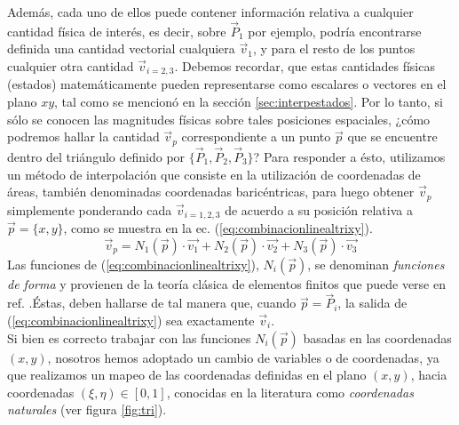 Además, cada uno de ellos puede contener información relativa a cualquier cantidad física de interés, es decir, sobre $ \vec{P}_{1} $ por ejemplo, podría encontrarse definida una cantidad vectorial cualquiera $ \vec{v}_{1}$, y para el resto de los puntos cualquier otra cantidad $ \vec{v}_{i=2,3} $. Debemos recordar, que estas cantidades físicas (estados) matemáticamente pueden representarse como escalares o vectores en el plano $xy$, tal como se mencionó en la sección \ref{sec:interpestados}. Por lo tanto, si sólo se conocen las magnitudes físicas sobre tales posiciones espaciales, ¿cómo podremos hallar la cantidad $ \vec{v}_{p} $ correspondiente a un punto $\vec{p}$ que se encuentre dentro del triángulo definido por $ \lbrace \vec{P}_{1}, \vec{P}_{2}, \vec{P}_{3}  \rbrace $? Para responder a ésto, utilizamos un método de interpolación que consiste en la utilización de coordenadas de áreas, también denominadas coordenadas baricéntricas, para luego obtener $ \vec{v}_{p} $ simplemente ponderando cada $ \vec{v}_{i=1,2,3} $ de acuerdo a su posición relativa a $ \vec{p} = \lbrace x,y \rbrace $, como se muestra en la ec. (\ref{eq:combinacionlinealtrixy}).
\begin{equation}
\label{eq:combinacionlinealtrixy}  
  \vec{v}_{p} = 
  N_{1}(\vec{p}) \cdot \vec{v_1} + 
  N_{2}(\vec{p}) \cdot \vec{v_2} + 
  N_{3}(\vec{p}) \cdot \vec{v_3} 
\end{equation}
Las funciones de (\ref{eq:combinacionlinealtrixy}), $ N_{i} ( \vec{p} )$, se denominan \emph{funciones de forma} y provienen de la teoría clásica de elementos finitos que puede verse en ref. \cite{FE}.Éstas, deben hallarse de tal manera que, cuando $ \vec{p} = \vec{P}_{i} $, la salida de (\ref{eq:combinacionlinealtrixy}) sea exactamente $\vec{v}_{i}$.\\
Si bien es correcto trabajar con las funciones $ N_{i} ( \vec{p} )$ basadas en las coordenadas $(x,y)$, nosotros hemos adoptado un cambio de variables o de coordenadas, ya que realizamos un mapeo de las coordenadas definidas en el plano $(x,y)$, hacia coordenadas $ (\xi, \eta) \in [0, 1] $, conocidas en la literatura como \emph{coordenadas naturales} (ver figura \ref{fig:tri}).

